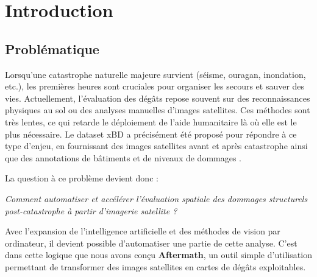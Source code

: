 \documentclass[french,12pt]{article}
\begin{document}
\section{Introduction}

\subsection{Problématique}

Lorsqu'une catastrophe naturelle majeure survient (séisme, ouragan, inondation, etc.), les premières heures sont cruciales pour organiser les secours et sauver des vies. Actuellement, l'évaluation des dégâts repose souvent sur des reconnaissances physiques au sol ou des analyses manuelles d'images satellites. Ces méthodes sont très lentes, ce qui retarde le déploiement de l'aide humanitaire là où elle est le plus nécessaire. Le dataset xBD a précisément été proposé pour répondre à ce type d'enjeu, en fournissant des images satellites avant et après catastrophe ainsi que des annotations de bâtiments et de niveaux de dommages \cite{xbd}.

La question à ce problème devient donc :
\begin{center}
\textit{Comment automatiser et accélérer l'évaluation spatiale des dommages structurels post-catastrophe à partir d'imagerie satellite ?}
\end{center}

Avec l'expansion de l'intelligence artificielle et des méthodes de vision par ordinateur, il devient possible d'automatiser une partie de cette analyse. C'est dans cette logique que nous avons conçu \textbf{Aftermath}, un outil simple d'utilisation permettant de transformer des images satellites en cartes de dégâts exploitables.
\end{document}

